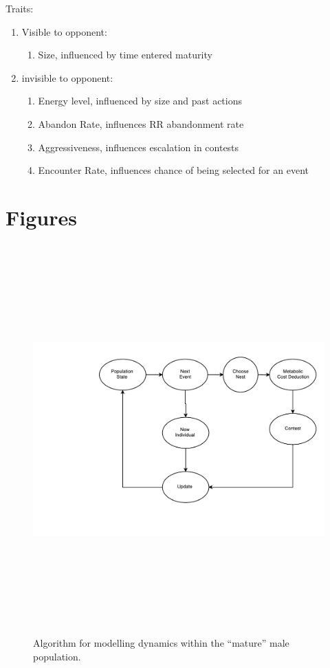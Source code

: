 \documentclass[a4paper,11pt]{article}
\begin{document}
Traits:
\begin{enumerate}
    \item Visible to opponent:
    \begin{enumerate}
        \item Size, influenced by time entered maturity
    \end{enumerate}
    \item invisible to opponent:
    \begin{enumerate}
        \item Energy level, influenced by size and past actions
        \item Abandon Rate, influences RR abandonment rate
        \item Aggressiveness, influences escalation in contests
        \item Encounter Rate, influences chance of being selected for an event
    \end{enumerate}
\end{enumerate}

\section{Figures}

\begin{figure}[h!]
\centering
\includegraphics[width=15cm,height=15cm,keepaspectratio]{figures/event_algorithm}
\caption{Algorithm for modelling dynamics within the ``mature'' male population.}
\label{fig:events}
\end{figure}
\clearpage
\end{document}
